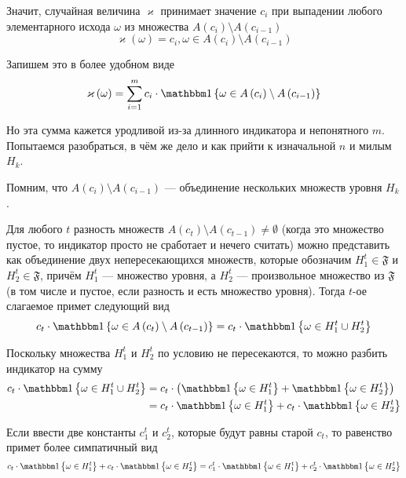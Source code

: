 Значит, случайная величина $\varkappa$ принимает значение $c_i$
при выпадении любого элементарного исхода $\omega$
из множества $A\left( c_{i} \right) \setminus A\left( c_{i-1} \right)$
\begin{equation}\label{randomVariableFirst}
    \varkappa\left( \omega \right) = c_i,
        \omega \in A\left( c_{i} \right) \setminus A\left( c_{i-1} \right)
\end{equation}

Запишем это в более удобном виде
$$\varkappa\left( \omega \right)
    = \sum_{i=1}^m c_i \cdot \Indicator{\omega
        \in A\left( c_{i} \right) \setminus A\left( c_{i-1} \right)}$$

Но эта сумма кажется уродливой из-за длинного индикатора и непонятного $m$.
Попытаемся разобраться,
в чём же дело и как прийти к изначальной $n$ и милым $H_k$.

Помним, что $A\left( c_{i} \right) \setminus A\left( c_{i-1} \right)$ ---
объединение нескольких множеств уровня $H_k$.

Для любого $t$ разность множеств
$A\left( c_{t} \right) \setminus A\left( c_{t-1} \right) \neq \emptyset$
(когда это множество пустое, то индикатор просто не сработает и нечего считать)
можно представить как объединение двух непересекающихся множеств,
которые обозначим $H_1^t \in \mathfrak{F}$ и $H_2^t \in \mathfrak{F}$,
причём $H_1^t$ --- множество уровня, а $H_2^t$ --- произвольное множество
из $\mathfrak{F}$ (в том числе и пустое, если разность и есть множество уровня).
Тогда $t$-ое слагаемое примет следующий вид
$$c_t \cdot \Indicator{\omega \in
    A\left( c_{t} \right) \setminus A\left( c_{t-1} \right)}
    = c_t \cdot \Indicator{\omega \in H_1^t \cup H_2^t}$$

Поскольку множества $H_1^t$ и $H_2^t$ по условию не пересекаются,
то можно разбить индикатор на сумму
\begin{align*}
c_t \cdot \Indicator{\omega \in H_1^t \cup H_2^t}
    &= c_t \cdot \left( \Indicator{\omega \in H_1^t}
        + \Indicator{\omega \in H_2^t} \right) \\
    &= c_t \cdot \Indicator{\omega \in H_1^t}
        + c_t \cdot \Indicator{\omega \in H_2^t}
\end{align*}

Если ввести две константы $c_1^t$ и $c_2^t$, которые будут равны старой $c_t$,
то равенство примет более симпатичный вид
$$c_t \cdot \Indicator{\omega \in H_1^t}
    + c_t \cdot \Indicator{\omega \in H_2^t}
    = c_1^t \cdot \Indicator{\omega \in H_1^t}
    + c_2^t \cdot \Indicator{\omega \in H_2^t}$$

